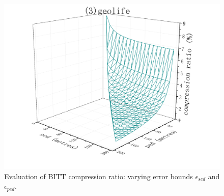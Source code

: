 {\begin{figure}[tb!]
	\includegraphics[scale = 0.210]{figures/Fig-BITT-geolife-compression-ratio.png}\hspace{1ex}
	\caption{\small Evaluation of BITT compression ratio: varying error bounds $\epsilon_{sed}$ and $\epsilon_{ped}$.}
	\label{fig:bitt-compression-ratio}
\end{figure}


}
